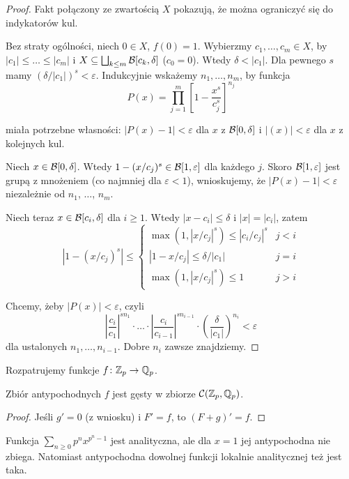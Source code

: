 \begin{proof}
	Fakt połączony ze zwartością $X$ pokazują, że można ograniczyć się do indykatorów kul.

	Bez straty ogólności, niech $0 \in X$, $f(0) = 1$.
	Wybierzmy $c_1, \ldots, c_m \in X$, by $|c_1| \le \ldots \le |c_m|$ i $X \subseteq \bigsqcup_{k \le m} \mathcal B[c_k, \delta]$ ($c_0 = 0$).
	Wtedy $\delta <|c_1|$.
	Dla pewnego $s$ mamy $(\delta / |c_1|)^s < \varepsilon$.
	Indukcyjnie wskażemy $n_1, \ldots, n_m$, by funkcja
	\[
		P(x) = \prod_{j=1}^m \left[1 - \frac{x^s}{c_j^s}\right]^{n_j}
	\]

	miała potrzebne własności: $|P(x) - 1| < \varepsilon$ dla $x$ z $\mathcal B[0, \delta]$ i $|(x)| < \varepsilon$ dla $x$ z kolejnych kul.

	Niech $x \in \mathcal B[0, \delta]$.
	Wtedy $1 - (x/c_j)^s \in \mathcal B[1, \varepsilon]$ dla każdego $j$.
	Skoro $\mathcal B[1, \varepsilon]$ jest grupą z mnożeniem (co najmniej dla $\varepsilon < 1$), wnioskujemy, że $|P(x) - 1| < \varepsilon$ niezależnie od $n_1$, $\ldots$, $n_m$.

	Niech teraz $x \in \mathcal B[c_i, \delta]$ dla $i \ge 1$.
	Wtedy $|x - c_i| \le \delta$ i $|x| = |c_i|$, zatem
	\[
		|1 - (x/c_j)^s| \le \begin{cases} \max(1, |x/c_j|^s) \le |c_i / c_j|^s & j < i \\
		|1 - x/c_j| \le \delta / |c_1| & j = i \\
		\max(1, |x / c_j|^s) \le 1 & j > i\end{cases}
	\]

	Chcemy, żeby $|P(x)| < \varepsilon$, czyli
	\[
		\left|\frac{c_i}{c_1}\right|^{sn_1} \cdot \ldots \cdot \left|\frac{c_i}{c_{i-1}}\right|^{sn_{i-1}} \cdot \left(\frac{\delta}{|c_1|}\right)^{n_i} < \varepsilon
	\]
	dla ustalonych $n_1, \ldots, n_{i-1}$.
	Dobre $n_i$ zawsze znajdziemy.
\end{proof}

Rozpatrujemy funkcje $f \colon \mathbb Z_p \to \mathbb Q_p$.

\begin{fakt}
	Zbiór antypochodnych $f$ jest gęsty w zbiorze $\mathcal C(\mathbb Z_p, \mathbb Q_p)$.
\end{fakt}

\begin{proof}
	Jeśli $g' = 0$ (z wniosku) i $F' = f$, to $(F + g)' = f$.
\end{proof}

Funkcja $\sum_{n \ge 0} p^n x^{p^n- 1}$ jest analityczna, ale dla $x = 1$ jej antypochodna nie zbiega.
Natomiast antypochodna dowolnej funkcji lokalnie analitycznej też jest taka.

